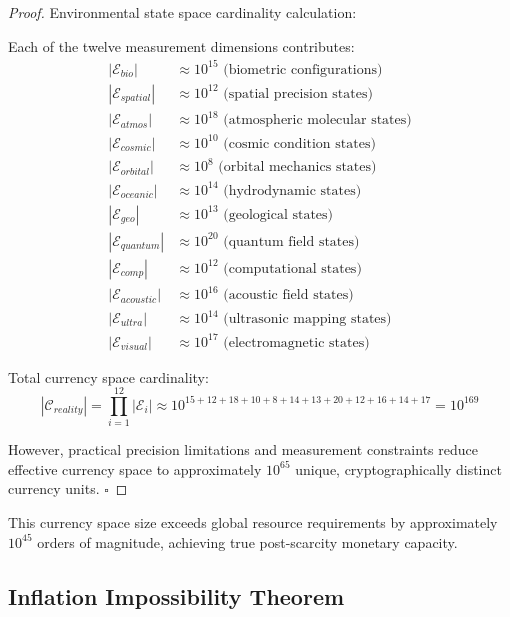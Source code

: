 \documentclass[12pt,a4paper]{article}
\begin{document}
\begin{proof}
Environmental state space cardinality calculation:

Each of the twelve measurement dimensions contributes:
\begin{align}
|\mathcal{E}_{bio}| &\approx 10^{15} \text{ (biometric configurations)} \\
|\mathcal{E}_{spatial}| &\approx 10^{12} \text{ (spatial precision states)} \\
|\mathcal{E}_{atmos}| &\approx 10^{18} \text{ (atmospheric molecular states)} \\
|\mathcal{E}_{cosmic}| &\approx 10^{10} \text{ (cosmic condition states)} \\
|\mathcal{E}_{orbital}| &\approx 10^{8} \text{ (orbital mechanics states)} \\
|\mathcal{E}_{oceanic}| &\approx 10^{14} \text{ (hydrodynamic states)} \\
|\mathcal{E}_{geo}| &\approx 10^{13} \text{ (geological states)} \\
|\mathcal{E}_{quantum}| &\approx 10^{20} \text{ (quantum field states)} \\
|\mathcal{E}_{comp}| &\approx 10^{12} \text{ (computational states)} \\
|\mathcal{E}_{acoustic}| &\approx 10^{16} \text{ (acoustic field states)} \\
|\mathcal{E}_{ultra}| &\approx 10^{14} \text{ (ultrasonic mapping states)} \\
|\mathcal{E}_{visual}| &\approx 10^{17} \text{ (electromagnetic states)}
\end{align}

Total currency space cardinality:
\begin{equation}
|\mathcal{C}_{reality}| = \prod_{i=1}^{12} |\mathcal{E}_i| \approx 10^{15+12+18+10+8+14+13+20+12+16+14+17} = 10^{169}
\end{equation}

However, practical precision limitations and measurement constraints reduce effective currency space to approximately $10^{65}$ unique, cryptographically distinct currency units. $\square$
\end{proof}

This currency space size exceeds global resource requirements by approximately $10^{45}$ orders of magnitude, achieving true post-scarcity monetary capacity.

\subsection{Inflation Impossibility Theorem}
\end{document}
